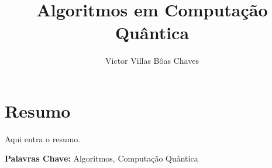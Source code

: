 \documentclass{imetex}
\author{Victor Villas Bôas Chaves}
\title{Algoritmos em Computação Quântica}
\date{\the\year}
\begin{document}
 
\printFrontMatter

\chapter*{Resumo}
Aqui entra o resumo.

\textbf{Palavras Chave:} Algoritmos, Computação Quântica


\printBackMatter

\end{document}
